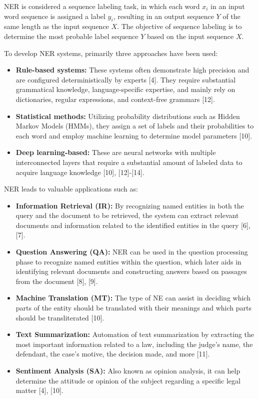 NER is considered a sequence labeling task\cite{martin-2020-speech}, in which each word $x_i$ in an input word sequence is assigned a label $y_i$, resulting in an output sequence $Y$ of the same length as the input sequence $X$. The objective of sequence labeling is to determine the most probable label sequence $Y$ based on the input sequence $X$.

To develop NER systems, primarily three approaches have been used:
\begin{itemize}
    \item \textbf{Rule-based systems:} These systems often demonstrate high precision and are configured deterministically by experts [4]. They require substantial grammatical knowledge, language-specific expertise, and mainly rely on dictionaries, regular expressions, and context-free grammars [12].
    \item \textbf{Statistical methods:} Utilizing probability distributions such as Hidden Markov Models (HMMs), they assign a set of labels and their probabilities to each word and employ machine learning to determine model parameters [10].
    \item \textbf{Deep learning-based:} These are neural networks with multiple interconnected layers that require a substantial amount of labeled data to acquire language knowledge [10], [12]-[14].
\end{itemize}

NER leads to valuable applications such as:
\begin{itemize}
    \item\textbf{Information Retrieval (IR):} By recognizing named entities in both the query and the document to be retrieved, the system can extract relevant documents and information related to the identified entities in the query [6], [7].
    \item\textbf{Question Answering (QA):} NER can be used in the question processing phase to recognize named entities within the question, which later aids in identifying relevant documents and constructing answers based on passages from the document [8], [9].
    \item\textbf{Machine Translation (MT):} The type of NE can assist in deciding which parts of the entity should be translated with their meanings and which parts should be transliterated [10].
    \item\textbf{Text Summarization:} Automation of text summarization by extracting the most important information related to a law, including the judge's name, the defendant, the case's motive, the decision made, and more [11].
    \item\textbf{Sentiment Analysis (SA):} Also known as opinion analysis, it can help determine the attitude or opinion of the subject regarding a specific legal matter [4], [10].
\end{itemize}


